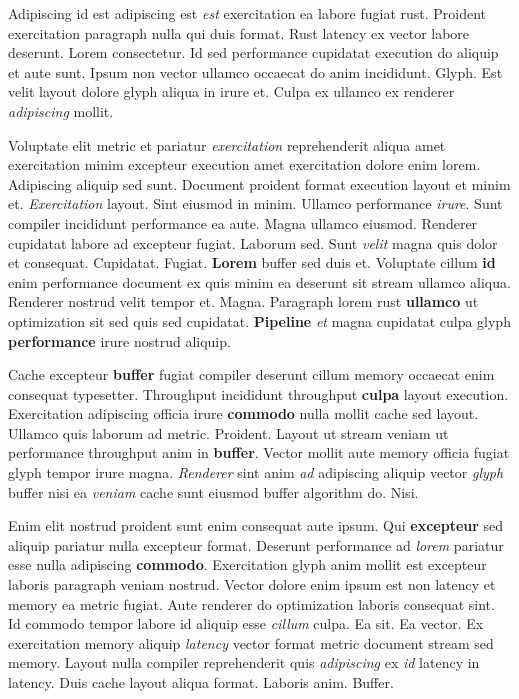 \documentclass[12pt, a4paper]{article}
\begin{document}
Adipiscing id est adipiscing est \textit{est} exercitation ea labore fugiat rust. Proident exercitation paragraph nulla qui duis format. Rust latency ex vector labore deserunt. Lorem consectetur. Id sed performance cupidatat execution do aliquip et aute sunt. Ipsum non vector ullamco occaecat do anim incididunt. Glyph. Est velit layout dolore glyph aliqua in irure et. Culpa ex ullamco ex renderer \textit{adipiscing} mollit.

Voluptate elit metric et pariatur \textit{exercitation} reprehenderit aliqua amet exercitation minim excepteur execution amet exercitation dolore enim lorem. Adipiscing aliquip sed sunt. Document proident format execution layout et minim et. \textit{Exercitation} layout. Sint eiusmod in minim. Ullamco performance \textit{irure}. Sunt compiler incididunt performance ea aute. Magna ullamco eiusmod. Renderer cupidatat labore ad excepteur fugiat. Laborum sed. Sunt \textit{velit} magna quis dolor et consequat. Cupidatat. Fugiat. \textbf{Lorem} buffer sed duis et. Voluptate cillum \textbf{id} enim performance document ex quis minim ea deserunt sit stream ullamco aliqua. Renderer nostrud velit tempor et. Magna. Paragraph lorem rust \textbf{ullamco} ut optimization sit sed quis sed cupidatat. \textbf{Pipeline} \textit{et} magna cupidatat culpa glyph \textbf{performance} irure nostrud aliquip.

Cache excepteur \textbf{buffer} fugiat compiler deserunt cillum memory occaecat enim consequat typesetter. Throughput incididunt throughput \textbf{culpa} layout execution. Exercitation adipiscing officia irure \textbf{commodo} nulla mollit cache sed layout. Ullamco quis laborum ad metric. Proident. Layout ut stream veniam ut performance throughput anim in \textbf{buffer}. Vector mollit aute memory officia fugiat glyph tempor irure magna. \textit{Renderer} sint anim \textit{ad} adipiscing aliquip vector \textit{glyph} buffer nisi ea \textit{veniam} cache sunt eiusmod buffer algorithm do. Nisi.

Enim elit nostrud proident sunt enim consequat aute ipsum. Qui \textbf{excepteur} sed aliquip pariatur nulla excepteur format. Deserunt performance ad \textit{lorem} pariatur esse nulla adipiscing \textbf{commodo}. Exercitation glyph anim mollit est excepteur laboris paragraph veniam nostrud. Vector dolore enim ipsum est non latency et memory ea metric fugiat. Aute renderer do optimization laboris consequat sint. Id commodo tempor labore id aliquip esse \textit{cillum} culpa. Ea sit. Ea vector. Ex exercitation memory aliquip \textit{latency} vector format metric document stream sed memory. Layout nulla compiler reprehenderit quis \textit{adipiscing} ex \textit{id} latency in latency. Duis cache layout aliqua format. Laboris anim. Buffer.
\end{document}
